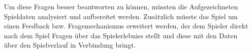 \documentclass[german]{cgspaper} %
\begin{document}
Um diese Fragen besser beantworten zu können, müssten die Aufgezeichneten Spieldaten analysiert und aufbereitet werden.
Zusätzlich müsste das Spiel um einen Feedback bzw. Fragemechanismus erweitert werden, der dem Spieler direkt nach dem Spiel Fragen über das Spielerlebniss stellt und diese mit den Daten über den Spielverlauf in Verbindung bringt.



\end{document}
